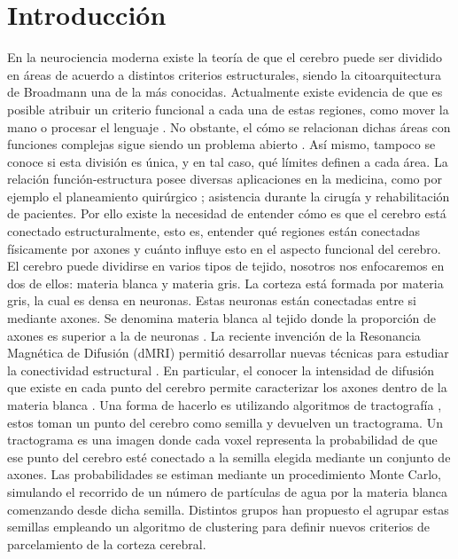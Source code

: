 \chapter{Introducci\'on}

En la neurociencia moderna existe la teor\'ia de que el cerebro
puede ser dividido en \'areas de acuerdo a distintos criterios estructurales,
siendo la citoarquitectura de Broadmann \cite{Brodmann1909} una de la m\'as conocidas.
Actualmente existe evidencia de que es posible atribuir un criterio funcional
a cada una de estas regiones, como mover la mano o procesar el lenguaje
\cite{Greicius2003}. No obstante, el c\'omo se relacionan dichas \'areas con funciones
complejas sigue siendo un problema abierto \cite{Barch2013}. As\'i mismo, tampoco
se conoce si esta divisi\'on es \'unica, y en tal caso, qu\'e l\'imites definen
a cada \'area. La relaci\'on funci\'on-estructura posee diversas aplicaciones en la
medicina, como por ejemplo el planeamiento quir\'urgico \cite{Stufflebeam2011}
\cite{Oishi2010}; asistencia durante la cirug\'ia \cite{DeSchotten2005} y rehabilitaci\'on
\cite{Song2014} de pacientes. Por ello existe la necesidad de entender c\'omo es
que el cerebro est\'a conectado estructuralmente, esto es, entender qu\'e regiones
est\'an conectadas f\'isicamente por axones y cu\'anto influye esto en el aspecto
funcional del cerebro. \\

El cerebro puede dividirse en varios tipos de tejido, nosotros nos enfocaremos en
dos de ellos: materia blanca y materia gris. La corteza est\'a formada por 
materia gris, la cual es densa en neuronas. Estas neuronas est\'an conectadas 
entre si mediante axones. Se denomina materia blanca al tejido donde la 
proporci\'on de axones es superior a la de neuronas \cite{Dale2008}. La reciente
invenci\'on de la Resonancia Magn\'etica de Difusi\'on (dMRI) permiti\'o
desarrollar nuevas t\'ecnicas para estudiar la conectividad estructural \cite{Taylor1985}. 
En particular, el conocer la intensidad de difusi\'on que existe en cada punto del 
cerebro permite caracterizar los axones dentro de la materia blanca \cite{Hagmann2006}.
Una forma de hacerlo es utilizando algoritmos de tractograf\'ia \cite{Descoteaux2009}
\cite{Jbabdi2007}, estos toman un punto del cerebro como semilla y devuelven un
tractograma. Un tractograma es una imagen donde cada voxel representa la
probabilidad de que ese punto del cerebro est\'e conectado a la semilla elegida
mediante un conjunto de axones. Las probabilidades se estiman mediante un 
procedimiento Monte Carlo, simulando el recorrido de un n\'umero de part\'iculas
de agua por la materia blanca comenzando desde dicha semilla. Distintos grupos
han propuesto el agrupar estas semillas empleando un algoritmo de clustering para
definir nuevos criterios de parcelamiento de la corteza cerebral. \\

